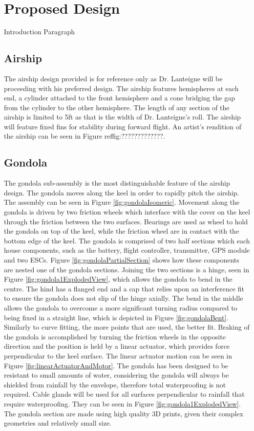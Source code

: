 \documentclass[../main.tex]{subfiles}
\begin{document}
\chapter{Proposed Design}
Introduction Paragraph
\section{Airship}
The airship design provided is for reference only as Dr. Lanteigne will be proceeding with his preferred design. The airship features hemispheres at each end, a cylinder attached to the front hemisphere and a cone bridging the gap from the cylinder to the other hemisphere. The length of any section of the airship is limited to 5ft as that is the width of Dr. Lanteigne's roll. The airship will feature fixed fins for stability during forward flight. An artist's rendition of the airship can be seen in Figure ref{fig:?????????????}.
\section{Gondola}
The gondola sub-assembly is the most distinguishable feature of the airship design. The gondola moves along the keel in order to rapidly pitch the airship. The assembly can be seen in  Figure \ref{fig:gondolaIsomeric}. Movement along the gondola is driven by two friction wheels which interface with the cover on the keel through the friction between the two surfaces. Bearings are used as wheel to hold the gondola on top of the keel, while the friction wheel are in contact with the bottom edge of the keel. The gondola is comprised of two half sections which each house components, such as the battery, flight controller, transmitter, GPS module and two ESCs. Figure \ref{fig:gondolaPartialSection} shows how these components are  nested one of the gondola sections. Joining the two sections is a hinge, seen in Figure  \ref{fig:gondola1ExplodedView}, which allows the gondola to bend in the centre. The hind has a flanged end and a cap that relies upon an interference fit to ensure the gondola does not slip of the hinge axially. The bend in the middle allows the gondola to overcome a more significant turning radius compared to being fixed in a straight line, which is depicted in Figure \ref{fig:gondolaBent}. Similarly to curve fitting, the more points that are used, the better fit. Braking of the gondola is accomplished by turning the friction wheels in the opposite direction and the position is held by a linear actuator, which provides force perpendicular to the keel surface. The linear actuator motion can be seen in Figure \ref{fig:linearActuatorAndMotor}. The gondola has been designed to be resistant to small amounts of water, considering the gondola will always be shielded from rainfall by the envelope, therefore total waterproofing is not required. Cable glands will be used for all surfaces perpendicular to rainfall that require waterproofing. They can be seen in Figure \ref{fig:gondola1ExplodedView}. The gondola section are made using high quality 3D prints, given their complex geometries and relatively small size.
\\
\end{document}
